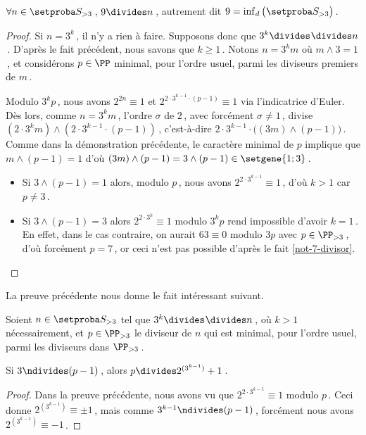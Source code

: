 

\begin{fact} \label{9-divisor}
	$\forall n \in \ourset_{>3}$\,, $9 \divides n$\,, autrement dit $9 = \dinf \big( \ourset_{>3} \big)$\,.
\end{fact}

\begin{proof}
	Si $n = 3^k$\,, il n'y a rien à faire. Supposons donc que $3^k \strictdivides n$\,. 
	D'après le fait précédent, nous savons que $k \geq 1$\,. Notons $n = 3^k m$ où $m \wedge 3 = 1$\,, et considérons $p\in\PP$ minimal, pour l'ordre usuel, parmi les diviseurs premiers de $m$\,.
	
	\medskip

	Modulo $3^k p$\,, nous avons
	$2^{2n} \equiv 1$
	et
	$2^{2 \cdot 3^{k-1} \cdot (p-1)} \equiv 1$
	via l'indicatrice d'Euler.
	Dès lors, comme $n = 3^k m$\,, l'ordre $\sigma$ de $2$\,, avec forcément $\sigma \neq 1$\,, divise 
	$(2 \cdot 3^k m) \wedge (2 \cdot 3^{k-1} \cdot (p-1))$\,,
	c'est-à-dire
	$2 \cdot 3^{k-1} \cdot \big( (3 m) \wedge (p-1) \big)$\,.
	Comme dans la démonstration précédente, le caractère minimal de $p$ implique que 
	$m \wedge (p-1) = 1$
	d'où
	$(3 m) \wedge (p-1) = 3 \wedge (p-1) \in \setgene{1 ; 3}$\,.
	\begin{itemize}
		\item Si $3 \wedge (p-1) = 1$ alors, modulo $p$\,,
		nous avons $2^{2 \cdot 3^{k-1}} \equiv 1$\,, d'où $k > 1$ car $p \neq 3$\,.

		\item Si $3 \wedge (p-1) = 3$ alors $2^{2 \cdot 3^k} \equiv 1$ modulo $3^k p$ rend impossible d'avoir $k = 1$\,.
		En effet, dans le cas contraire, on aurait $63 \equiv 0$ modulo $3 p$ avec $p \in \PP_{>3}$\,, d'où forcément $p = 7$\,,
		or ceci n'est pas possible d'après le fait \ref{not-7-divisor}.
	\end{itemize}
\end{proof}




La preuve précédente nous donne le fait intéressant suivant.


\begin{fact}
	Soient 
	$n \in \ourset_{>3}$ tel que $3^k \strictdivides n$\,, où $k > 1$ nécessairement,
	et
	$p \in \PP_{>3}$ le diviseur de $n$ qui est minimal, pour l'ordre usuel, parmi les diviseurs dans $\PP_{>3}$\,.
	
	\medskip
	
	Si $3 \ndivides (p-1)$\,, alors $p \divides 2^{(3^{k-1})} + 1$\,.
\end{fact}


\begin{proof}
	Dans la preuve précédente, nous avons vu que $2^{2 \cdot 3^{k-1}} \equiv 1$ modulo $p$\,.
	Ceci donne $2^{( 3^{k-1} )} \equiv \pm 1$\,, mais comme $3^{k-1} \ndivides (p-1)$\,, forcément nous avons $2^{( 3^{k-1} )} \equiv -1$\,.
\end{proof}
